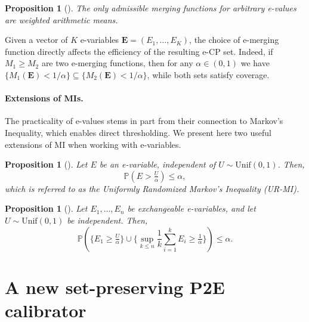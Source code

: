 \documentclass{article}
\theoremstyle{plain}
\newtheorem{proposition}[theorem]{Proposition}
\theoremstyle{definition}
\theoremstyle{remark}
\begin{document}
\begin{proposition}[\citet{wang2025only}]
\label{prop:Wang_merg}
The only admissible merging functions for arbitrary e-values are weighted arithmetic means.
\end{proposition}

Given a vector of $K$ e-variables $\mathbf{E}=(E_1,\ldots,E_K)$, the choice of e-merging function directly affects the efficiency of the resulting e-CP set. Indeed, if $M_1 \geq M_2$ are two e-merging functions, then for any $\alpha\in(0,1)$ we  have $\{M_1(\mathbf{E}) < 1/\alpha\} \subseteq \{M_2(\mathbf{E}) < 1/\alpha\}$, while both sets satisfy coverage.

\paragraph{Extensions of MIs.} 
The practicality of e-values stems in part from their connection to Markov's Inequality, which enables direct thresholding. We present here two useful extensions of MI when working with e-variables. 

\begin{proposition}[\citet{ramdas2023randomizedexchangeableimprovementsmarkovs}]
\label{prop:URMI}
Let $E$ be an e-variable, independent of $U \sim \mathrm{Unif}(0,1)$. Then,
\begin{equation*}
    \mathbb{P}\!\left(E > \tfrac{U}{\alpha}\right) \leq \alpha,
\end{equation*}
which is referred to as the \emph{Uniformly Randomized Markov's Inequality (UR-MI)}.
\end{proposition}

\begin{proposition}[\citet{Manole_2023_exch}]
\label{prop:UR-EMI}
Let $E_1, \dots, E_n$ be exchangeable e-variables, and let $U \sim \mathrm{Unif}(0,1)$ be independent. Then,
\begin{equation*}
    \mathbb{P}\!\left(\bigl\{E_1 \ge \tfrac{U}{\alpha}\bigr\} \cup 
    \biggl\{\sup_{k \leq n} \frac{1}{k}\sum_{i=1}^k E_i \ge \tfrac{1}{\alpha}\biggr\}\right) \leq \alpha.
\end{equation*}
\end{proposition}



\section{A new set-preserving P2E calibrator}\label{sec:ptoe_cp}
\end{document}
